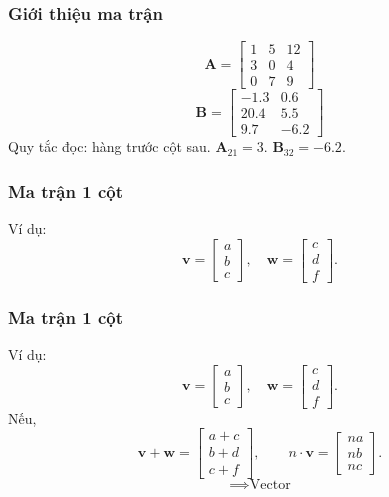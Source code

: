 \begin{frame}
    \frametitle{Giới thiệu ma trận}
    \[ \mathbf{A}=
\begin{bmatrix}
    1&5&12\\
    3&0&4\\
    0&7&9
\end{bmatrix}
\]
\[\mathbf{B}=\begin{bmatrix}
    -1.3&0.6\\
    20.4&5.5\\
    9.7&-6.2
\end{bmatrix}\]
Quy tắc đọc: hàng trước cột sau.\newline
\(\mathbf{A}_{21}=3\).\newline
\(\mathbf{B}_{32}=-6.2\).
\end{frame}
\begin{frame}
    \frametitle{Ma trận 1 cột}
    Ví dụ:
    \[\mathbf{v}=\begin{bmatrix}
    a\\b\\c
\end{bmatrix}, \quad \mathbf{w}=\begin{bmatrix}
    c\\d\\f
\end{bmatrix}.\]
\end{frame}
\begin{frame}
    \frametitle{Ma trận 1 cột}
    Ví dụ: 
    \[\mathbf{v}=\begin{bmatrix}
    a\\b\\c
\end{bmatrix}, \quad \mathbf{w}=\begin{bmatrix}
    c\\d\\f
\end{bmatrix}.\]
Nếu,
\[\mathbf{v}+\mathbf{w}=\begin{bmatrix}
    a+c\\b+d\\c+f
\end{bmatrix},\qquad
    n\cdot\mathbf{v}=\begin{bmatrix}
        na\\nb\\nc
\end{bmatrix}.\] \[\implies \text{Vector}\]
\end{frame}
